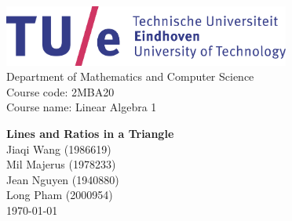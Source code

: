 \begin{titlepage}
    \begin{center}
        \includegraphics[height=2cm]{figures/tue-logo-high} \\

        \large
        Department of Mathematics and Computer Science \\
        Course code: 2MBA20 \\
        Course name: Linear Algebra 1 \\

        \vspace*{5cm}

        \huge
        \textbf{Lines and Ratios in a Triangle } \\
        \Large
        \vspace*{10mm}
        Jiaqi Wang (1986619) \\
        Mil Majerus (1978233) \\
        Jean Nguyen (1940880) \\
        Long Pham (2000954) \\

        \vfill
        \today
    \end{center}
\end{titlepage}